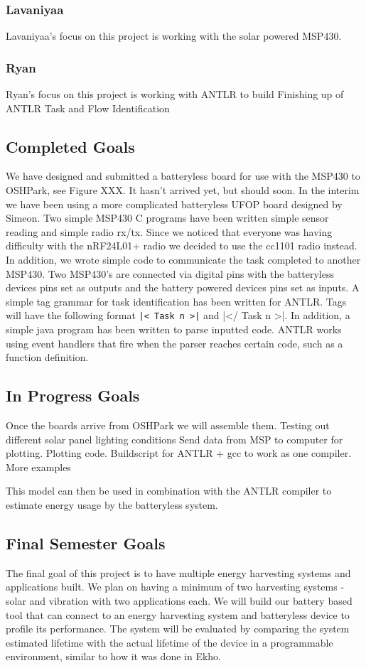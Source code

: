 \subsubsection{Lavaniyaa}
Lavaniyaa's focus on this project is working with the solar powered MSP430.

\subsubsection{Ryan}
Ryan's focus on this project is working with ANTLR to build
Finishing up of ANTLR Task and Flow Identification

\subsection{Completed Goals}

We have designed and submitted a batteryless board for use with the MSP430 to OSHPark, see Figure XXX.
It hasn't arrived yet, but should soon.
In the interim we have been using a more complicated batteryless UFOP board designed by Simeon.
Two simple MSP430 C programs have been written simple sensor reading and simple radio rx/tx.
Since we noticed that everyone was having difficulty with the nRF24L01+ radio we decided to use the cc1101 radio instead.
In addition, we wrote simple code to communicate the task completed to another MSP430.
Two MSP430's are connected via digital pins with the batteryless devices pins set as outputs and the battery powered devices pins set as inputs.
A simple tag grammar for task identification has been written for ANTLR.
Tags will have the following format {\tt |< Task n >|} and |</ Task n >|.
In addition, a simple java program has been written to parse inputted code.
ANTLR works using event handlers that fire when the parser reaches certain code, such as a function definition.

\subsection{In Progress Goals}

Once the boards arrive from OSHPark we will assemble them.
Testing out different solar panel lighting conditions
Send data from MSP to computer for plotting.
Plotting code.
Buildscript for ANTLR + gcc to work as one compiler.
More examples

This model can then be used in combination with the ANTLR compiler to estimate energy usage by the batteryless system.




\subsection{Final Semester Goals}
The final goal of this project is to have multiple energy harvesting systems and applications built.
We plan on having a minimum of two harvesting systems - solar and vibration with two applications each.
We will build our battery based tool that can connect to an energy harvesting system and batteryless device to profile its performance.
The system will be evaluated by comparing the system estimated lifetime with the actual lifetime of the device in a programmable environment, similar to how it was done in Ekho.
